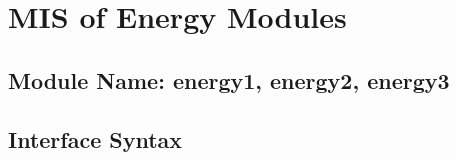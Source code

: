 \documentclass[12pt]{article}
\begin{document}
\section{MIS of Energy Modules}

\subsection{Module Name: energy1, energy2, energy3}





\subsection{Interface Syntax}


\end{document}
